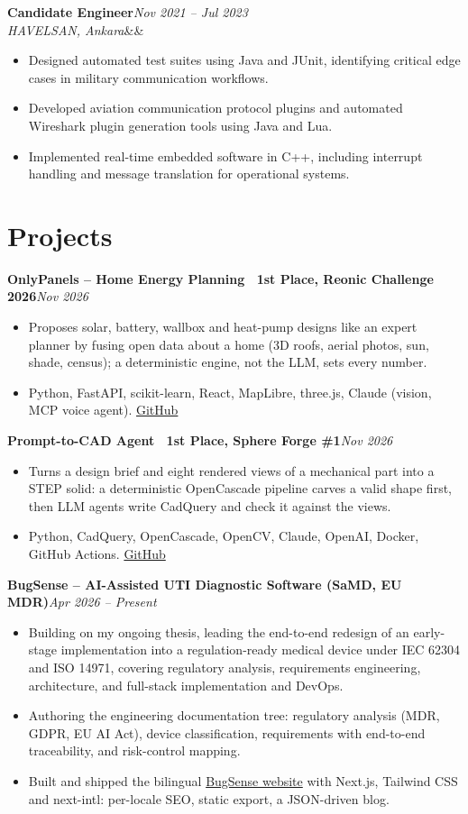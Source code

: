 \documentclass[10pt,a4paper]{article}
\newcommand{\role}[4]{\textbf{#1}\hfill\textit{#2}\\\textit{#3}\ifx&#4&\else\ \textperiodcentered\ #4\fi}
\newcommand{\proj}[2]{\needspace{4\baselineskip}\textbf{#1}\hfill\textit{#2}}
\newcommand{\award}[1]{\textcolor{link}{\textbf{#1}}}
\begin{document}
\role{Candidate Engineer}{Nov 2021 -- Jul 2023}{HAVELSAN, Ankara}{}
\begin{itemize}
  \item Designed automated test suites using Java and JUnit, identifying critical edge cases in military communication
        workflows.
  \item Developed aviation communication protocol plugins and automated Wireshark plugin generation tools using Java and Lua.
  \item Implemented real-time embedded software in C++, including interrupt handling and message translation for
        operational systems.
\end{itemize}

\section{Projects}
\proj{OnlyPanels -- Home Energy Planning \ \award{1st Place, Reonic Challenge 2026}}{Nov 2026}
\begin{itemize}
  \item Proposes solar, battery, wallbox and heat-pump designs like an expert planner by fusing open data about a
        home (3D roofs, aerial photos, sun, shade, census); a deterministic engine, not the LLM, sets every number.
  \item Python, FastAPI, scikit-learn, React, MapLibre, three.js, Claude (vision, MCP voice agent).
        \href{https://github.com/atahankilc/onlypanels}{GitHub}
\end{itemize}
\proj{Prompt-to-CAD Agent \ \award{1st Place, Sphere Forge \#1}}{Nov 2026}
\begin{itemize}
  \item Turns a design brief and eight rendered views of a mechanical part into a STEP solid: a deterministic
        OpenCascade pipeline carves a valid shape first, then LLM agents write CadQuery and check it against the views.
  \item Python, CadQuery, OpenCascade, OpenCV, Claude, OpenAI, Docker, GitHub Actions.
        \href{https://github.com/atahankilc/sphere-hackathon}{GitHub}
\end{itemize}
\proj{BugSense -- AI-Assisted UTI Diagnostic Software (SaMD, EU MDR)}{Apr 2026 -- Present}
\begin{itemize}
  \item Building on my ongoing thesis, leading the end-to-end redesign of an early-stage implementation into a
        regulation-ready medical device under IEC 62304 and ISO 14971, covering regulatory analysis, requirements
        engineering, architecture, and full-stack implementation and DevOps.
  \item Authoring the engineering documentation tree: regulatory analysis (MDR, GDPR, EU AI Act), device
        classification, requirements with end-to-end traceability, and risk-control mapping.
  \item Built and shipped the bilingual \href{https://bugsensedx.com}{BugSense website} with Next.js, Tailwind CSS and
        next-intl: per-locale SEO, static export, a JSON-driven blog.
\end{itemize}
\end{document}

